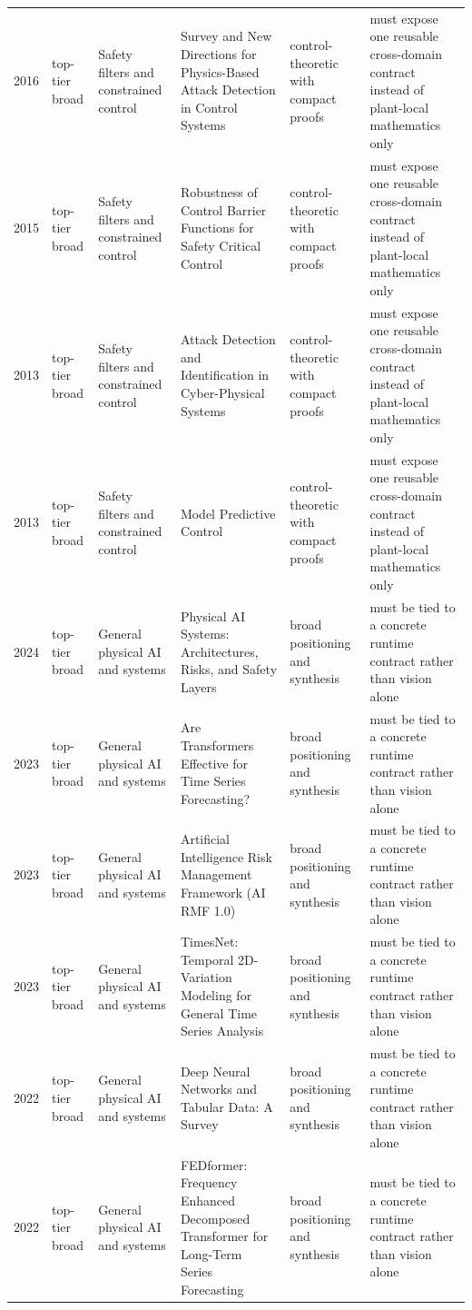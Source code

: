 \begin{longtable}{p{}p{}p{}p{}p{}p{}}
2016 & top-tier broad & Safety filters and constrained control & Survey and New Directions for Physics-Based Attack Detection in Control Systems & control-theoretic with compact proofs & must expose one reusable cross-domain contract instead of plant-local mathematics only\\
2015 & top-tier broad & Safety filters and constrained control & Robustness of Control Barrier Functions for Safety Critical Control & control-theoretic with compact proofs & must expose one reusable cross-domain contract instead of plant-local mathematics only\\
2013 & top-tier broad & Safety filters and constrained control & Attack Detection and Identification in Cyber-Physical Systems & control-theoretic with compact proofs & must expose one reusable cross-domain contract instead of plant-local mathematics only\\
2013 & top-tier broad & Safety filters and constrained control & Model Predictive Control & control-theoretic with compact proofs & must expose one reusable cross-domain contract instead of plant-local mathematics only\\
2024 & top-tier broad & General physical AI and systems & Physical AI Systems: Architectures, Risks, and Safety Layers & broad positioning and synthesis & must be tied to a concrete runtime contract rather than vision alone\\
2023 & top-tier broad & General physical AI and systems & Are Transformers Effective for Time Series Forecasting? & broad positioning and synthesis & must be tied to a concrete runtime contract rather than vision alone\\
2023 & top-tier broad & General physical AI and systems & Artificial Intelligence Risk Management Framework (AI RMF 1.0) & broad positioning and synthesis & must be tied to a concrete runtime contract rather than vision alone\\
2023 & top-tier broad & General physical AI and systems & TimesNet: Temporal 2D-Variation Modeling for General Time Series Analysis & broad positioning and synthesis & must be tied to a concrete runtime contract rather than vision alone\\
2022 & top-tier broad & General physical AI and systems & Deep Neural Networks and Tabular Data: A Survey & broad positioning and synthesis & must be tied to a concrete runtime contract rather than vision alone\\
2022 & top-tier broad & General physical AI and systems & FEDformer: Frequency Enhanced Decomposed Transformer for Long-Term Series Forecasting & broad positioning and synthesis & must be tied to a concrete runtime contract rather than vision alone\\

\end{longtable}
